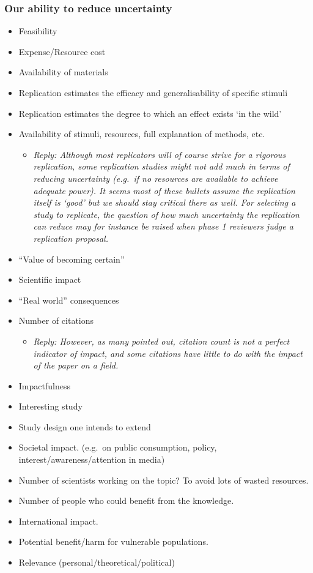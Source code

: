\documentclass[
]{article}
\providecommand{\tightlist}{%
  \setlength{\itemsep}{0pt}\setlength{\parskip}{0pt}}
\begin{document}
\hypertarget{our-ability-to-reduce-uncertainty}{%
\subsubsection{Our ability to reduce
uncertainty}\label{our-ability-to-reduce-uncertainty}}

\begin{itemize}
\item
  Feasibility
\item
  Expense/Resource cost
\item
  Availability of materials
\item
  Replication estimates the efficacy and generalisability of specific
  stimuli
\item
  Replication estimates the degree to which an effect exists `in the
  wild'
\item
  Availability of stimuli, resources, full explanation of methods, etc.

  \begin{itemize}
  \tightlist
  \item
    \emph{Reply: Although most replicators will of course strive for a
    rigorous replication, some replication studies might not add much in
    terms of reducing uncertainty (e.g.~if no resources are available to
    achieve adequate power). It seems most of these bullets assume the
    replication itself is `good' but we should stay critical there as
    well. For selecting a study to replicate, the question of how much
    uncertainty the replication can reduce may for instance be raised
    when phase 1 reviewers judge a replication proposal.}
  \end{itemize}
\item
  ``Value of becoming certain''
\item
  Scientific impact
\item
  ``Real world'' consequences
\item
  Number of citations

  \begin{itemize}
  \tightlist
  \item
    \emph{Reply: However, as many pointed out, citation count is not a
    perfect indicator of impact, and some citations have little to do
    with the impact of the paper on a field. }
  \end{itemize}
\item
  Impactfulness
\item
  Interesting study
\item
  Study design one intends to extend
\item
  Societal impact. (e.g.~on public consumption, policy,
  interest/awareness/attention in media)
\item
  Number of scientists working on the topic? To avoid lots of wasted
  resources.
\item
  Number of people who could benefit from the knowledge.
\item
  International impact.
\item
  Potential benefit/harm for vulnerable populations.
\item
  Relevance (personal/theoretical/political)
\end{itemize}
\end{document}
